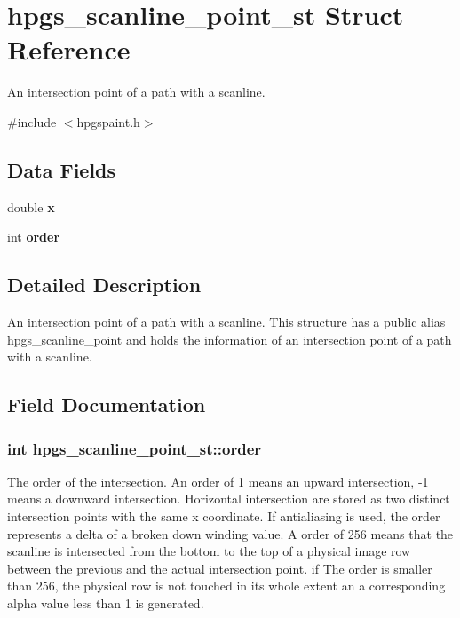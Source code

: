 \section{hpgs\_\-scanline\_\-point\_\-st Struct Reference}
\label{structhpgs__scanline__point__st}


An intersection point of a path with a scanline.  




{\ttfamily \#include $<$hpgspaint.h$>$}

\subsection*{Data Fields}
\begin{DoxyCompactItemize}
\item 
double {\bf x}
\item 
int {\bf order}
\end{DoxyCompactItemize}


\subsection{Detailed Description}
An intersection point of a path with a scanline. This structure has a public alias {\ttfamily hpgs\_\-scanline\_\-point} and holds the information of an intersection point of a path with a scanline. 

\subsection{Field Documentation}
\subsubsection[{order}]{\setlength{\rightskip}{0pt plus 5cm}int {\bf hpgs\_\-scanline\_\-point\_\-st::order}}\label{structhpgs__scanline__point__st_add5b602518f4cb82caa6f337ef2df81b}
The order of the intersection. An {\ttfamily order} of 1 means an upward intersection, -\/1 means a downward intersection. Horizontal intersection are stored as two distinct intersection points with the same x coordinate. If antialiasing is used, the order represents a delta of a broken down winding value. A order of 256 means that the scanline is intersected from the bottom to the top of a physical image row between the previous and the actual intersection point. if The order is smaller than 256, the physical row is not touched in its whole extent an a corresponding alpha value less than 1 is generated. 

